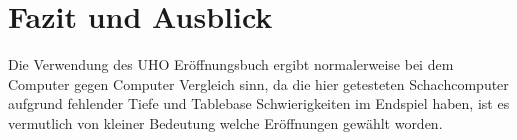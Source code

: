 \chapter{Fazit und Ausblick}

Die Verwendung des \ac{UHO} Eröffnungsbuch ergibt normalerweise bei dem Computer gegen Computer Vergleich sinn, da die hier getesteten Schachcomputer aufgrund fehlender Tiefe und Tablebase Schwierigkeiten im Endspiel haben, ist es vermutlich von kleiner Bedeutung welche Eröffnungen gewählt worden.







